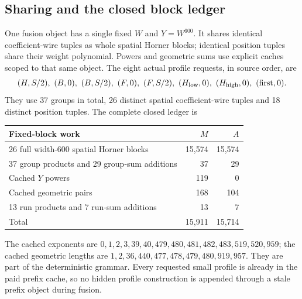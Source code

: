 \documentclass[11pt,letterpaper]{article}
\theoremstyle{definition}\newtheorem{definition}[theorem]{Definition}
\theoremstyle{remark}\newtheorem{remark}[theorem]{Remark}
\newcommand{\op}[1]{\mathrm{#1}}
\begin{document}
\subsection{Sharing and the closed block ledger}
One fusion object has a single fixed $W$ and $Y=W^{600}$. It shares identical coefficient-wire tuples as whole spatial Horner blocks; identical position tuples share their weight polynomial. Powers and geometric sums use explicit caches scoped to that same object. The eight actual profile requests, in source order, are
\[
 (H,S/2),\ (B,0),\ (B,S/2),\ (F,0),\ (F,S/2),\
 (H_{\rm low},0),\ (H_{\rm high},0),\ (\op{first},0).
\]
They use 37 groups in total, 26 distinct spatial coefficient-wire tuples and 18 distinct position tuples. The complete closed ledger is
\begin{center}\small
\begin{tabular}{@{}lrr@{}}\toprule
Fixed-block work&$M$&$A$\\\midrule
26 full width-600 spatial Horner blocks&15,574&15,574\\
37 group products and 29 group-sum additions&37&29\\
Cached $Y$ powers&119&0\\
Cached geometric pairs&168&104\\
13 run products and 7 run-sum additions&13&7\\\midrule
Total&15,911&15,714\\\bottomrule
\end{tabular}
\end{center}
The cached exponents are $0,1,2,3,39,40,479,480,481,482,483,519,520,959$; the cached geometric lengths are $1,2,36,440,477,478,479,480,919,957$. They are part of the deterministic grammar. Every requested small profile is already in the paid prefix cache, so no hidden profile construction is appended through a stale prefix object during fusion.
\end{document}
